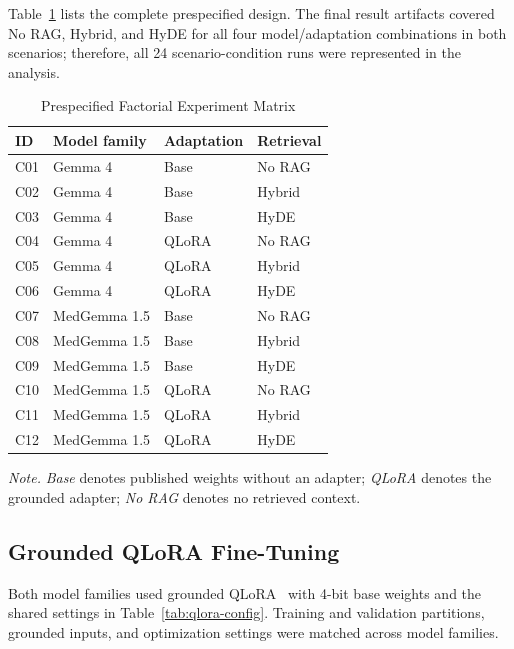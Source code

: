 Table~\ref{tab:factorial} lists the complete prespecified design. The final
result artifacts covered No RAG, Hybrid, and HyDE for all four
model/adaptation combinations in both scenarios; therefore, all 24
scenario-condition runs were represented in the analysis.

\begin{table}[t]
\footnotesize
\centering
\begin{threeparttable}
\caption{Prespecified Factorial Experiment Matrix}
\label{tab:factorial}
\begin{tabular*}{\columnwidth}{@{\extracolsep{\fill}}llll@{}}
\toprule
\textbf{ID} & \textbf{Model family} & \textbf{Adaptation} & \textbf{Retrieval} \\
\midrule
C01 & Gemma 4     & Base  & No RAG \\
C02 & Gemma 4     & Base  & Hybrid \\
C03 & Gemma 4     & Base  & HyDE \\
C04 & Gemma 4     & QLoRA & No RAG \\
C05 & Gemma 4     & QLoRA & Hybrid \\
C06 & Gemma 4     & QLoRA & HyDE \\
C07 & MedGemma 1.5 & Base  & No RAG \\
C08 & MedGemma 1.5 & Base  & Hybrid \\
C09 & MedGemma 1.5 & Base  & HyDE \\
C10 & MedGemma 1.5 & QLoRA & No RAG \\
C11 & MedGemma 1.5 & QLoRA & Hybrid \\
C12 & MedGemma 1.5 & QLoRA & HyDE \\
\bottomrule
\end{tabular*}
\begin{tablenotes}[flushleft]
\footnotesize
\item[] \textit{Note.} \textit{Base} denotes published weights without an
adapter; \textit{QLoRA} denotes the grounded adapter; \textit{No RAG} denotes
no retrieved context.
\end{tablenotes}
\end{threeparttable}
\end{table}

\subsection{Grounded QLoRA Fine-Tuning}
\label{sec:qlora}
Both model families used grounded QLoRA~\cite{dettmers2023qlora} with
4-bit base weights and the shared settings in
Table~\ref{tab:qlora-config}. Training and validation partitions, grounded
inputs, and optimization settings were matched across model families.

